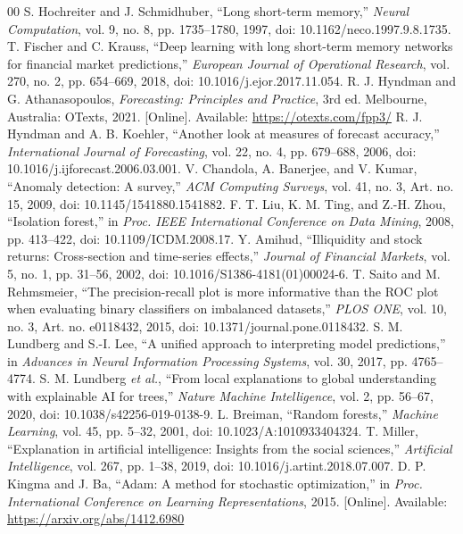 \documentclass[conference]{IEEEtran}
\begin{document}
\begin{thebibliography}{00}
 S. Hochreiter and J. Schmidhuber, ``Long short-term memory,'' \textit{Neural Computation}, vol. 9, no. 8, pp. 1735--1780, 1997, doi: 10.1162/neco.1997.9.8.1735.
 T. Fischer and C. Krauss, ``Deep learning with long short-term memory networks for financial market predictions,'' \textit{European Journal of Operational Research}, vol. 270, no. 2, pp. 654--669, 2018, doi: 10.1016/j.ejor.2017.11.054.
 R. J. Hyndman and G. Athanasopoulos, \textit{Forecasting: Principles and Practice}, 3rd ed. Melbourne, Australia: OTexts, 2021. [Online]. Available: \url{https://otexts.com/fpp3/}
 R. J. Hyndman and A. B. Koehler, ``Another look at measures of forecast accuracy,'' \textit{International Journal of Forecasting}, vol. 22, no. 4, pp. 679--688, 2006, doi: 10.1016/j.ijforecast.2006.03.001.
 V. Chandola, A. Banerjee, and V. Kumar, ``Anomaly detection: A survey,'' \textit{ACM Computing Surveys}, vol. 41, no. 3, Art. no. 15, 2009, doi: 10.1145/1541880.1541882.
 F. T. Liu, K. M. Ting, and Z.-H. Zhou, ``Isolation forest,'' in \textit{Proc. IEEE International Conference on Data Mining}, 2008, pp. 413--422, doi: 10.1109/ICDM.2008.17.
 Y. Amihud, ``Illiquidity and stock returns: Cross-section and time-series effects,'' \textit{Journal of Financial Markets}, vol. 5, no. 1, pp. 31--56, 2002, doi: 10.1016/S1386-4181(01)00024-6.
 T. Saito and M. Rehmsmeier, ``The precision-recall plot is more informative than the ROC plot when evaluating binary classifiers on imbalanced datasets,'' \textit{PLOS ONE}, vol. 10, no. 3, Art. no. e0118432, 2015, doi: 10.1371/journal.pone.0118432.
 S. M. Lundberg and S.-I. Lee, ``A unified approach to interpreting model predictions,'' in \textit{Advances in Neural Information Processing Systems}, vol. 30, 2017, pp. 4765--4774.
 S. M. Lundberg \textit{et al.}, ``From local explanations to global understanding with explainable AI for trees,'' \textit{Nature Machine Intelligence}, vol. 2, pp. 56--67, 2020, doi: 10.1038/s42256-019-0138-9.
 L. Breiman, ``Random forests,'' \textit{Machine Learning}, vol. 45, pp. 5--32, 2001, doi: 10.1023/A:1010933404324.
 T. Miller, ``Explanation in artificial intelligence: Insights from the social sciences,'' \textit{Artificial Intelligence}, vol. 267, pp. 1--38, 2019, doi: 10.1016/j.artint.2018.07.007.
 D. P. Kingma and J. Ba, ``Adam: A method for stochastic optimization,'' in \textit{Proc. International Conference on Learning Representations}, 2015. [Online]. Available: \url{https://arxiv.org/abs/1412.6980}
\end{thebibliography}
\end{document}
